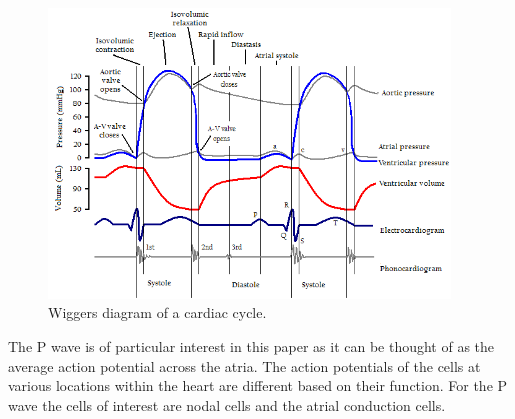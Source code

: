 \begin{figure}[H]
    \centering
    \includegraphics[width=0.95\textwidth]{images/Wiggers_Diagram.png}
    \caption{Wiggers diagram of a cardiac cycle. \citep{wiggers}}
    \label{fig2.4}
\end{figure}
The P wave is of particular interest in this paper as it can be thought of as the average action potential across the atria. The action potentials of the cells at various locations within the heart are different based on their function. For the P wave the cells of interest are nodal cells and the atrial conduction cells.

